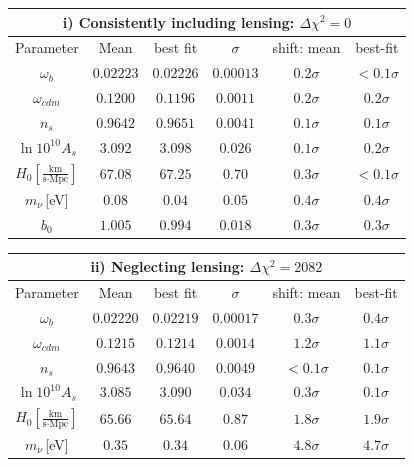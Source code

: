 \begin{table}[!t]
  \centering
  \begin{tabular}{@{}cccccc}
    \hline
    \multicolumn{6}{c}{i) Consistently including lensing: $\Delta \chi^2 = 0$} \\
    \hline
    Parameter & Mean & best fit & $\sigma$ &\hspace{-0.52cm} shift: mean & best-fit \\
    \hline
    $\omega_b$ & $0.02223$ & $0.02226 $ &$0.00013 $ &  \quad$0.2\sigma$ & $ <0.1\sigma$ \\
    $\omega_{cdm}$ & $0.1200 $ & $0.1196 $ & \quad$0.0011 $ &  \quad$0.2\sigma$ & $0.2\sigma$ \\
    $n_s$      & $0.9642 $ & $0.9651 $ & $0.0041 $ &  \quad$0.1\sigma$ & $ 0.1\sigma$ \\
    $\ln10^{10}A_s$ & $3.092 $ & $3.098$ & $0.026 $ &  \quad$0.1\sigma$ & $ 0.2\sigma$ \\
    $H_0\left[\frac{\text{km}}{\text{s}\cdot\text{Mpc}}\right]$      & $67.08$ & $67.25$ & $0.70$ &  \quad$0.3\sigma$ & $ <0.1\sigma$ \\
    $m_{\nu}$\,[eV]  & $0.08$ & $0.04$ & $0.05$ & \quad $ 0.4\sigma$ & $ 0.4\sigma$ \\
    $b_0$ & $1.005$ & $0.994$ & $0.018$ & $0.3\sigma$ & $0.3\sigma$ \\
  \end{tabular}
  \begin{tabular}{@{}cccccc}
    \hline
    \multicolumn{6}{c}{ii) Neglecting lensing: $\Delta \chi^2 = 2082$} \\
    \hline
    Parameter & Mean & best fit & $\sigma$ & \hspace{-0.52cm} shift: mean & best-fit \\
    \hline
    $\omega_b$ & $0.02220$ & $0.02219 $ & $0.00017 $ &  \quad$0.3\sigma$ & $0.4\sigma$ \\
    $\omega_{cdm}$ & $0.1215$ & $0.1214$ & $0.0014$ &  \quad$1.2\sigma$ & $1.1\sigma$ \\
    $n_s$      & $0.9643$ & $0.9640$ & $0.0049$ &  \quad$<0.1\sigma$ & $0.1\sigma$ \\
    $\ln10^{10}A_s$ & $ 3.085 $ & $3.090 $ & $ 0.034 $ &  \quad$0.3\sigma$ & $0.1\sigma$ \\
    $H_0\left[\frac{\text{km}}{\text{s}\cdot\text{Mpc}}\right]$      & $65.66$ & $65.64$ & $0.87$ &  \quad$1.8\sigma$ & $1.9\sigma$ \\
    $m_{\nu}$\,[eV]  & $0.35$ & $0.34$ & $0.06$ &  \quad$4.8\sigma$ & $4.7\sigma$ \\

\end{tabular}
\end{table}
